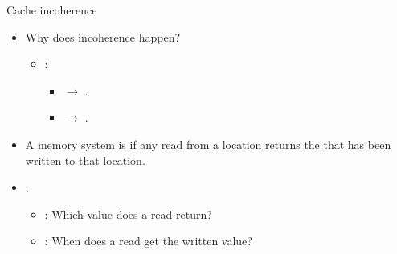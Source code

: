 \begin{frame}[t]{Cache incoherence}
\begin{itemize}
  \item Why does incoherence happen?
    \begin{itemize}
      \item {}:
        \begin{itemize}
          \item {} $\rightarrow$ .
          \item {} $\rightarrow$ .
      \end{itemize}
    \end{itemize}

  \item A memory system is  
        if any read from a location returns the 
        that has been written to that location.

  \item {}:
    \begin{itemize}
      \item {}: 
            Which value does a read return?
      \item {}: 
            When does a read get the written value?
    \end{itemize}
\end{itemize}
\end{frame}

